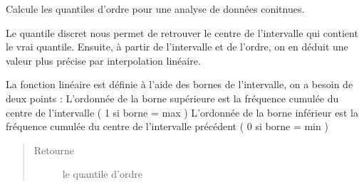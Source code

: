 \documentclass[letterpaper,10pt,openany,oneside,french]{sphinxmanual}
\begin{document}

\begin{fulllineitems}
\label{\detokenize{addQuantitativesContinues:add.addQuantitativesContinues.quantileContinu}}
Calcule les quantiles d’ordre  pour une analyse de données conitnues.

Le quantile discret nous permet de retrouver le centre de l’intervalle qui contient le vrai quantile.
Ensuite, à partir de l’intervalle et de l’ordre, on en déduit une valeur plus précise par interpolation linéaire.

La fonction linéaire est définie à l’aide des bornes de l’intervalle, on  a besoin de deux points :
L’ordonnée de la borne supérieure est la fréquence cumulée du centre de l’intervalle ( 1 si borne = max )
L’ordonnée de la borne inférieur est la fréquence cumulée du centre de l’intervalle précédent ( 0 si borne = min )
\begin{quote}\begin{description}
\item[{Retourne}] \leavevmode
le quantile d’ordre 

\end{description}\end{quote}

\end{fulllineitems}

\end{document}
